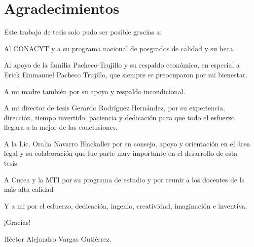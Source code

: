 \documentclass[12pt]{article}
\begin{document}
	
	
	
	
	
	\tableofcontents
	\newpage
	
	\section*{Agradecimientos}
	
	Este trabajo de tesis solo pudo ser posible gracias a:
	
	Al CONACYT y a su programa nacional de posgrados de calidad y su beca.
	
	Al apoyo de la familia Pacheco-Trujillo y su respaldo económico, en especial a Erick Emmanuel Pacheco Trujillo, que siempre se preocuparon por mi bienestar.
	
	A mi madre también por su apoyo y respaldo incondicional.
	
	A mi director de tesis Gerardo Rodríguez Hernández, por su experiencia, dirección, tiempo invertido, paciencia y dedicación para que todo el esfuerzo llegara a la mejor de las conclusiones.
	
	A la Lic. Oralia Navarro Blackaller por su consejo, apoyo y orientación en el área legal y su colaboración que fue parte muy importante en el desarrollo de esta tesis.
	
	A Cucea y la MTI por su programa de estudio y por reunir a los docentes de la más alta calidad
		
	Y a mi por el esfuerzo, dedicación, ingenio, creatividad, imaginación e inventiva.
	
	¡Gracias!
	
	Héctor Alejandro Vargas Gutiérrez.
	
	
\end{document}
